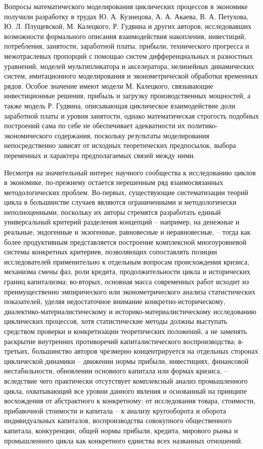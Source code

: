Вопросы математического моделирования циклических процессов в экономике получили разработку в трудах Ю. А. Кузнецова, А. А. Акаева, В. А. Петухова, Ю. Л. Плущевской, М. Калецкого, Р. Гудвина и других авторов, исследовавших возможности формального описания взаимодействия накопления, инвестиций, потребления, занятости, заработной платы, прибыли, технического прогресса и межотраслевых пропорций с помощью систем дифференциальных и разностных уравнений, моделей мультипликатора и акселератора, нелинейных динамических систем, имитационного моделирования и эконометрической обработки временных рядов. Особое значение имеют модели М. Калецкого, связывающие инвестиционные решения, прибыль и загрузку производственных мощностей, а также модель Р. Гудвина, описывающая циклическое взаимодействие доли заработной платы и уровня занятости, однако математическая строгость подобных построений сама по себе не обеспечивает адекватности их политико-экономического содержания, поскольку результаты моделирования непосредственно зависят от исходных теоретических предпосылок, выбора переменных и характера предполагаемых связей между ними.

Несмотря на значительный интерес научного сообщества к исследованию циклов в экономике, по-прежнему остается нерешенным ряд взаимосвязанных методологических проблем. Во-первых, существующие систематизации теорий цикла в большинстве случаев являются ограниченными и методологически неполноценными, поскольку их авторы стремятся разработать единый универсальный критерий разделения концепций – например, на денежные и реальные, эндогенные и экзогенные, равновесные и неравновесные, – тогда как более продуктивным представляется построение комплексной многоуровневой системы конкретных критериев, позволяющих сопоставлять позиции исследователей применительно к отдельным вопросам происхождения кризиса, механизма смены фаз, роли кредита, продолжительности цикла и исторических границ капитализма; во-вторых, основная масса современных работ исходит из преимущественно эмпирического или эконометрического анализа статистических показателей, уделяя недостаточное внимание конкретно-историческому, диалектико-материалистическому и историко-материалистическому исследованию циклических процессов, хотя статистические методы должны выступать средством проверки и конкретизации теоретических положений, а не заменять раскрытие внутренних противоречий капиталистического воспроизводства; в-третьих, большинство авторов чрезмерно концентрируется на отдельных сторонах циклической динамики – движении нормы прибыли, инвестициях, финансовой нестабильности, обновлении основного капитала или формах кризиса, – вследствие чего практически отсутствует комплексный анализ промышленного цикла, охватывающий все уровни данного явления и основанный на принципе восхождения от абстрактного к конкретному: от исследования товара, стоимости, прибавочной стоимости и капитала – к анализу кругооборота и оборота индивидуальных капиталов, воспроизводства совокупного общественного капитала, конкуренции, общей нормы прибыли, кредита, мирового рынка и промышленного цикла как конкретного единства всех названных отношений.

